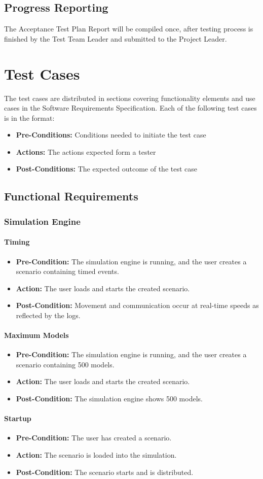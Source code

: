 \documentclass[titlepage]{article}
\newcommand{\testentry}[4]{
    \paragraph{#1}
    \begin{itemize}
        \item \textbf{Pre-Condition:} #2
        \item \textbf{Action:} #3
        \item \textbf{Post-Condition:} #4
    \end{itemize}
}
\begin{document}

\subsection{Progress Reporting}
    The Acceptance Test Plan Report will be compiled once, after testing process is finished by the Test Team Leader and submitted to the Project Leader.


\section{Test Cases%
    \label{cases}%
}

    The test cases are distributed in sections covering functionality elements and use cases in the Software Requirements Specification. Each of the following test cases is in the format:
    \begin{itemize}
        \item \textbf{Pre-Conditions:} Conditions needed to initiate the test case
        \item \textbf{Actions:} The actions expected form a tester
        \item \textbf{Post-Conditions:} The expected outcome of the test case
    \end{itemize}


\subsection{Functional Requirements%
    \label{functional}%
}

\subsubsection{Simulation Engine}
    \testentry{Timing}{
        The simulation engine is running, and the user creates a scenario containing timed events.
    }{
        The user loads and starts the created scenario.
    }{
        Movement and communication occur at real-time speeds as reflected by the logs.
    }
    \testentry{Maximum Models}{
        The simulation engine is running, and the user creates a scenario containing 500 models.
    }{
        The user loads and starts the created scenario.
    }{
        The simulation engine shows 500 models.
    }
    \testentry{Startup}{
        The user has created a scenario.
    }{
        The scenario is loaded into the simulation.
    }{
        The scenario starts and is distributed.
    }
\end{document}
